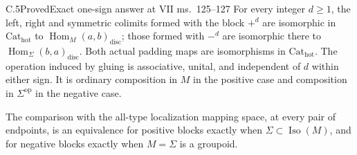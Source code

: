\begin{claim}{C.5}{Proved}{Exact one-sign answer at VII ms.~125--127}
For every integer $d\geq1$, the left, right and symmetric colimits
formed with the block $+^d$ are isomorphic in $\mathrm{Cat}_{\mathrm{hot}}$
to $\operatorname{Hom}_M(a,b)_{\mathrm{disc}}$; those formed with
$-^d$ are isomorphic there to
$\operatorname{Hom}_\Sigma(b,a)_{\mathrm{disc}}$.
Both actual padding maps are isomorphisms in
$\mathrm{Cat}_{\mathrm{hot}}$. The operation induced by gluing is
associative, unital, and independent of $d$ within either sign.
It is ordinary composition in $M$ in the positive case and
composition in $\Sigma^{\mathrm{op}}$ in the negative case.

The comparison with the all-type localization mapping space, at
every pair of endpoints, is an equivalence for positive blocks
exactly when $\Sigma\subset\operatorname{Iso}(M)$, and for
negative blocks exactly when $M=\Sigma$ is a groupoid.
\end{claim}
